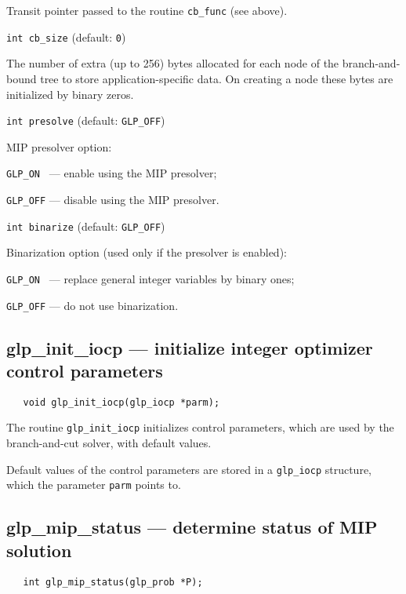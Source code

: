 Transit pointer passed to the routine \verb|cb_func| (see above).

\bigskip

{\tt int cb\_size} (default: {\tt 0})

The number of extra (up to 256) bytes allocated for each node of the
branch-and-bound tree to store application-specific data. On creating
a node these bytes are initialized by binary zeros.

\bigskip

{\tt int presolve} (default: {\tt GLP\_OFF})

MIP presolver option:

\verb|GLP_ON | --- enable using the MIP presolver;

\verb|GLP_OFF| --- disable using the MIP presolver.

\newpage

{\tt int binarize} (default: {\tt GLP\_OFF})

Binarization option (used only if the presolver is enabled):

\verb|GLP_ON | --- replace general integer variables by binary ones;

\verb|GLP_OFF| --- do not use binarization.

\subsection{glp\_init\_iocp --- initialize integer optimizer control
parameters}

\synopsis

\begin{verbatim}
   void glp_init_iocp(glp_iocp *parm);
\end{verbatim}

\description

The routine \verb|glp_init_iocp| initializes control parameters, which
are used by the branch-and-cut solver, with default values.

Default values of the control parameters are stored in
a \verb|glp_iocp| structure, which the parameter \verb|parm| points to.

\subsection{glp\_mip\_status --- determine status of MIP solution}

\synopsis

\begin{verbatim}
   int glp_mip_status(glp_prob *P);
\end{verbatim}

